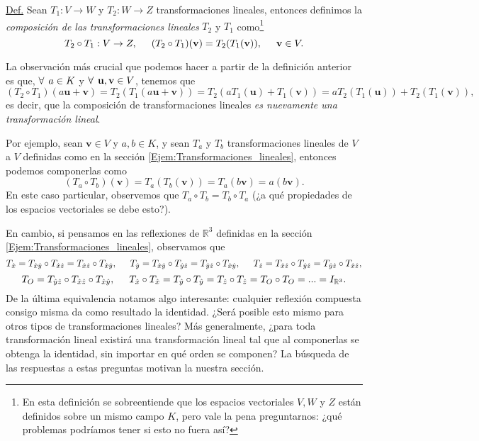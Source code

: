 \documentclass[12pt]{article}
\begin{document}
\begin{tcolorbox} \label{Def:Composición_de_transformaciones_lineales}
\underline{Def.} Sean $T_1: V\to W$ y $T_2: W\to Z$ transformaciones lineales, entonces definimos la \emph{composición de las transformaciones lineales} $T_2$ y $T_1$ como\footnote{En esta definición se sobreentiende que los espacios vectoriales $V, W$ y $Z$ están definidos sobre un mismo campo $K$, pero vale la pena preguntarnos: ¿qué problemas podríamos tener si esto no fuera así?} \[T_2\circ T_1:V\to Z, \hspace{5mm} (T_2\circ T_1)(\mathbf{v}) = T_2(T_1(\mathbf{v})), \hspace{5mm} \mathbf{v}\in V.\]

\end{tcolorbox}

La observación más crucial que podemos hacer a partir de la definición anterior es que, $\forall \hspace{1.5mm} a\in K$ y $\forall \hspace{1.5mm} \mathbf{u},\mathbf{v}\in V$, tenemos que \[(T_2\circ T_1)(a\mathbf{u}+\mathbf{v})=T_2(T_1(a\mathbf{u}+\mathbf{v}))=T_2(aT_1(\mathbf{u})+T_1(\mathbf{v})) = aT_2(T_1(\mathbf{u}))+T_2(T_1(\mathbf{v})),\] \noindent es decir, que la composición de transformaciones lineales \emph{es nuevamente una transformación lineal}.

Por ejemplo, sean $\mathbf{v}\in V$ y $a,b\in K$, y sean $T_a$ y $T_b$ transformaciones lineales de $V$ a $V$ definidas como en la sección \ref{Ejem:Transformaciones_lineales}, entonces podemos componerlas como \[
    (T_a\circ T_b)(\mathbf{v})=T_a(T_b(\mathbf{v}))=T_a(b\mathbf{v})=a(b\mathbf{v})
.\] \noindent En este caso particular, observemos que $T_a\circ T_b = T_b\circ T_a$ (¿a qué propiedades de los espacios vectoriales se debe esto?). 

En cambio, si pensamos en las reflexiones de $\mathbb{R}^3$ definidas en la sección \ref{Ejem:Transformaciones_lineales}, observamos que \[
    T_{\hat{x}}=T_{\hat{x}\hat{y}}\circ T_{\hat{x}\hat{z}}=T_{\hat{x}\hat{z}}\circ T_{\hat{x}\hat{y}}, \hspace{5mm} T_{\hat{y}}=T_{\hat{x}\hat{y}}\circ T_{\hat{y}\hat{z}}=T_{\hat{y}\hat{z}}\circ T_{\hat{x}\hat{y}},\hspace{5mm} T_{\hat{z}}=T_{\hat{x}\hat{z}}\circ T_{\hat{y}\hat{z}}=T_{\hat{y}\hat{z}}\circ T_{\hat{x}\hat{z}},
\] \[
T_O=T_{\hat{y}\hat{z}}\circ T_{\hat{x}\hat{z}} \circ T_{\hat{x}\hat{y}}, \hspace{5mm} T_{\hat{x}}\circ T_{\hat{x}} = T_{\hat{y}}\circ T_{\hat{y}} = T_{\hat{z}}\circ T_{\hat{z}} = T_O \circ T_O = ... = I_{\mathbb{R}^3}
.\] De la última equivalencia notamos algo interesante: cualquier reflexión compuesta consigo misma da como resultado la identidad. ¿Será posible esto mismo para otros tipos de transformaciones lineales? Más generalmente, ¿para toda transformación lineal existirá una transformación lineal tal que al componerlas se obtenga la identidad, sin importar en qué orden se componen? La búsqueda de las respuestas a estas preguntas motivan la nuestra sección.
\end{document}
